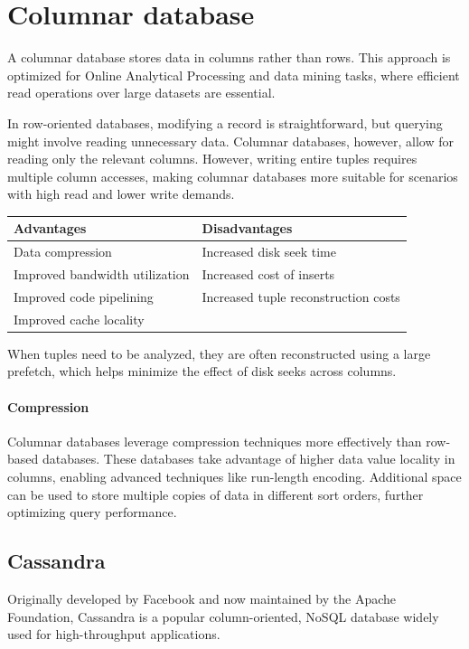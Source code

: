 \section{Columnar database}

A columnar database stores data in columns rather than rows. 
This approach is optimized for Online Analytical Processing and data mining tasks, where efficient read operations over large datasets are essential.

In row-oriented databases, modifying a record is straightforward, but querying might involve reading unnecessary data. 
Columnar databases, however, allow for reading only the relevant columns. 
However, writing entire tuples requires multiple column accesses, making columnar databases more suitable for scenarios with high read and lower write demands.
\begin{table}[H]
    \centering
    \begin{tabular}{|l|l|}
    \hline
    \textbf{Advantages}                 & \textbf{Disadvantages}                   \\ \hline
    Data compression                    & Increased disk seek time                 \\ \hline
    Improved bandwidth utilization      & Increased cost of inserts                \\ \hline
    Improved code pipelining            & Increased tuple reconstruction costs     \\ \hline
    Improved cache locality             &                                          \\ \hline
    \end{tabular}
\end{table}
\noindent When tuples need to be analyzed, they are often reconstructed using a large prefetch, which helps minimize the effect of disk seeks across columns.

\paragraph*{Compression}
Columnar databases leverage compression techniques more effectively than row-based databases. 
These databases take advantage of higher data value locality in columns, enabling advanced techniques like run-length encoding.
Additional space can be used to store multiple copies of data in different sort orders, further optimizing query performance.

\subsection{Cassandra}
Originally developed by Facebook and now maintained by the Apache Foundation, Cassandra is a popular column-oriented, NoSQL database widely used for high-throughput applications. 

